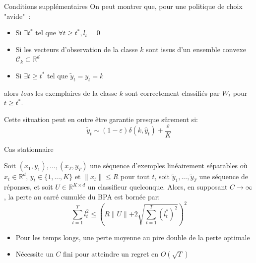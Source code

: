 \documentclass{beamer}
\begin{document}
\begin{frame}{Conditions supplémentaires}
	On peut montrer que, pour une politique de choix "avide"~:
	\begin{itemize}
		\item Si $\exists t^*$ tel que $\forall t \geq t^*, l_t =0$
		\item Si les vecteurs d'observation  de la classe $k$ sont issus d'un ensemble convexe $\mathcal{C}_k \subset \mathbb{R}^d$
		\item Si $\exists t \geq t^*$ tel que $\tilde{y}_t = y_t = k$
	\end{itemize}
	alors \textit{tous} les exemplaires de la classe $k$ sont correctement classifiés par $W_t$ pour $t \geq t^*$.
	
	Cette situation peut en outre être garantie presque sûrement si: 
	$$\tilde{y}_t \sim (1-\varepsilon) \delta(k,\hat{y}_t) + \frac{\varepsilon}{K} $$
\end{frame}

\begin{frame}{Cas stationnaire}
	\begin{footnotesize}
	\begin{theorem}
		Soit $(x_1,y_1),...,(x_T,y_T)$ une séquence d'exemples linéairement séparables où $x_t \in \mathbb{R}^d$, $y_t\in \{1,...,K\}$ et $\parallel x_t \parallel\leqslant R$ pour tout $t$, soit $\tilde{y}_1,...,\tilde{y}_T$ une séquence de réponses, et soit $U \in \mathbb{R}^{K\times d}$ un classifieur quelconque. Alors, en supposant $C \rightarrow \infty$, la perte au carré cumulée du BPA est bornée par:
		\begin{equation*}
	\sum_{t=1}^{T}l_t^2 \leqslant \left(R\parallel{U}\parallel+2 \sqrt{\sum_{t=1}^{T}(l_t^{\ast})^2}\right)^2 
		\end{equation*}
	\end{theorem}

	\begin{alertblock}{}
		\begin{itemize}
			\item Pour les temps longs, une perte moyenne au pire double de la perte optimale
			\item Nécessite un $C$ fini pour atteindre un regret en $O(\sqrt{T})$
		\end{itemize}
	\end{alertblock}
	\end{footnotesize}
\end{frame}
\end{document}
